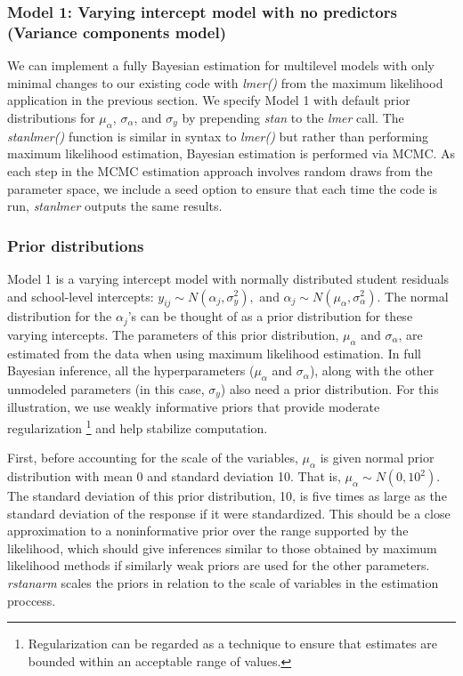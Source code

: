 \subsubsection*{Model 1: Varying intercept model with no predictors (Variance components model)}

We can implement a fully Bayesian estimation for multilevel models with only minimal changes to our existing code with \textit{lmer()} from the maximum likelihood application in the previous section. We specify Model 1 with default prior distributions for $\mu_{\alpha}$, $\sigma_{\alpha}$, and $\sigma_{y}$ by prepending \textit{stan\textunderscore} to the \textit{lmer} call. The \textit{stan\textunderscore lmer()} function is similar in syntax to \textit{lmer()} but rather than performing maximum likelihood estimation, Bayesian estimation is performed via MCMC.  As each step in the MCMC estimation approach involves random draws from the parameter space, we include a seed option to ensure that each time the code is run, \textit{stan\textunderscore lmer} outputs the same results.

\subsubsection*{Prior distributions}
Model 1 is a varying intercept model with normally distributed student residuals and school-level intercepts: $y_{ij} \sim N(\alpha_{j}, \sigma_{y}^{2}),$ and $\alpha_{j}\sim N(\mu_{\alpha}, \sigma_{\alpha}^{2})$. The normal distribution for the $\alpha_{j}$'s can be thought of as a prior distribution for these varying intercepts. The parameters of this prior distribution, $\mu_{\alpha}$ and $\sigma_{\alpha}$, are estimated from the data when using maximum likelihood estimation. In full Bayesian inference, all the hyperparameters ($\mu_{\alpha}$ and $\sigma_{\alpha}$), along with the other unmodeled parameters (in this case, $\sigma_{y}$) also need a prior distribution. For this illustration, we use weakly informative priors that provide moderate regularization \footnote{Regularization can be regarded as a technique to ensure that estimates are bounded within an acceptable range of values.} and help stabilize computation.

First, before accounting for the scale of the variables, $\mu_{\alpha}$ is given normal prior distribution with mean 0 and standard deviation 10.  That is, $\mu_{\alpha} \sim N(0, 10^2)$. The standard deviation of this prior distribution, 10, is five times as large as the standard deviation of the response if it were standardized. This should be a close approximation to a noninformative prior over the range supported by the likelihood, which should give inferences similar to those obtained by maximum likelihood methods if similarly weak priors are used for the other parameters. \textit{rstanarm} scales the priors in relation to the scale of variables in the estimation proccess.


